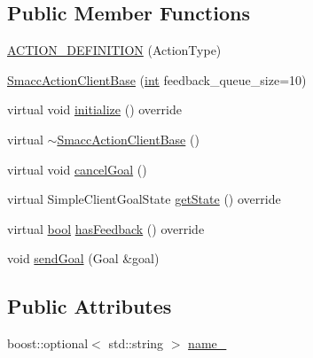 \subsection*{Public Member Functions}
\begin{DoxyCompactItemize}
\item 
\hyperlink{classsmacc_1_1SmaccActionClientBase_aee053cafcc5c2e56c3c60a7de16be31a}{A\+C\+T\+I\+O\+N\+\_\+\+D\+E\+F\+I\+N\+I\+T\+I\+ON} (Action\+Type)
\item 
\hyperlink{classsmacc_1_1SmaccActionClientBase_af55217911e61d8345903f52acada3f11}{Smacc\+Action\+Client\+Base} (\hyperlink{classint}{int} feedback\+\_\+queue\+\_\+size=10)
\item 
virtual void \hyperlink{classsmacc_1_1SmaccActionClientBase_a0224d7482b50a706f99bd280495ef1af}{initialize} () override
\item 
virtual \hyperlink{classsmacc_1_1SmaccActionClientBase_a36e490ea3174b379fa0d809f60cf02e1}{$\sim$\+Smacc\+Action\+Client\+Base} ()
\item 
virtual void \hyperlink{classsmacc_1_1SmaccActionClientBase_ab953ee383c5dd627a62c36d06c365930}{cancel\+Goal} ()
\item 
virtual Simple\+Client\+Goal\+State \hyperlink{classsmacc_1_1SmaccActionClientBase_a7a3edf84a8126dc723f3fc5e082aecf0}{get\+State} () override
\item 
virtual \hyperlink{classbool}{bool} \hyperlink{classsmacc_1_1SmaccActionClientBase_a4746ad2b84551095274051ca58a9996d}{has\+Feedback} () override
\item 
void \hyperlink{classsmacc_1_1SmaccActionClientBase_a58c67a87c5fb8ea1633573c58fe3eee1}{send\+Goal} (Goal \&goal)
\end{DoxyCompactItemize}
\subsection*{Public Attributes}
\begin{DoxyCompactItemize}
\item 
boost\+::optional$<$ std\+::string $>$ \hyperlink{classsmacc_1_1SmaccActionClientBase_a8464e3ec514e57333339fc538a2203f4}{name\+\_\+}
\end{DoxyCompactItemize}
